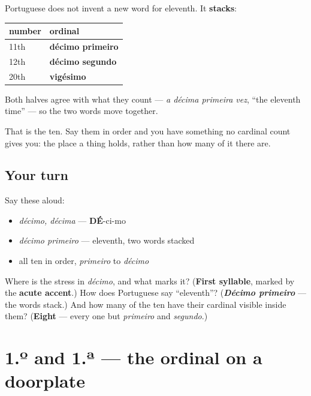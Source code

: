 \begin{grammarlens}[title={Grammar Lens: past ten, the words stack}]
Portuguese does not invent a new word for eleventh. It \textbf{stacks}:

\noindent
\begin{tabularx}{\linewidth}{@{}>{\raggedright\arraybackslash}X>{\raggedright\arraybackslash}X@{}}
\toprule
\textbf{number} & \textbf{ordinal} \\
\midrule
11th & \textbf{décimo primeiro} \\
12th & \textbf{décimo segundo} \\
20th & \textbf{vigésimo} \\
\bottomrule
\end{tabularx}

Both halves agree with what they count — \emph{a décima primeira vez}, \textquotedblleft{}the eleventh time\textquotedblright{} — so the two words move together.

That is the ten. Say them in order and you have something no cardinal count gives you: the place a thing holds, rather than how many of it there are.
\end{grammarlens}

\subsection*{Your turn}
Say these aloud:

\begin{itemize}
\raggedright
  \item \emph{décimo, décima} — \textbf{DÉ}-ci-mo
  \item \emph{décimo primeiro} — eleventh, two words stacked
  \item all ten in order, \emph{primeiro} to \emph{décimo}
\end{itemize}

\begin{tcolorbox}[breakable,colback=teal!4,colframe=teal!35!black,title={Before you move on}]
Where is the stress in \emph{décimo}, and what marks it? (\textbf{First syllable}, marked by the \textbf{acute accent}.) How does Portuguese say \textquotedblleft{}eleventh\textquotedblright{}? (\emph{\textbf{Décimo primeiro}} — the words stack.) And how many of the ten have their cardinal visible inside them? (\textbf{Eight} — every one but \emph{primeiro} and \emph{segundo}.)
\end{tcolorbox}
\section[1.º / 1.ª]{1.º and 1.ª — the ordinal on a doorplate}

